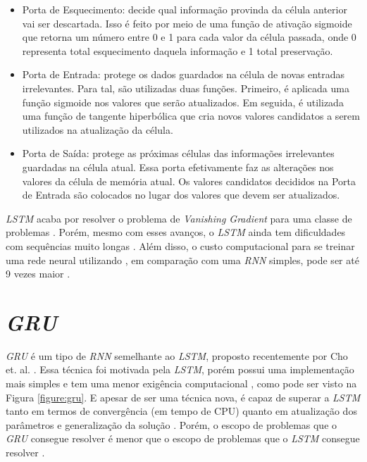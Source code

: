 \begin{itemize}
  \item Porta de Esquecimento: decide qual informação provinda da célula anterior vai ser descartada. Isso é feito por meio de uma função de ativação sigmoide que retorna um número entre 0 e 1 para cada valor da célula passada, onde 0 representa total esquecimento daquela informação e 1 total preservação.
  
  \item Porta de Entrada: protege os dados guardados na célula de novas entradas irrelevantes. Para tal, são utilizadas duas funções. Primeiro, é aplicada uma função sigmoide nos valores que serão atualizados. Em seguida, é utilizada uma função de tangente hiperbólica que cria novos valores candidatos a serem utilizados na atualização da célula.
  
  \item Porta de Saída: protege as próximas células das informações irrelevantes guardadas na célula atual. Essa porta efetivamente faz as alterações nos valores da célula de memória atual. Os valores candidatos decididos na Porta de Entrada são colocados no lugar dos valores que devem ser atualizados.
\end{itemize}

\textit{\acrshort{LSTM}} acaba por resolver o problema de \textit{Vanishing Gradient} para uma classe de problemas \cite{doi:10.1162/neco.1997.9.8.1735}. Porém, mesmo com esses avanços, o \textit{\acrshort{LSTM}} ainda tem dificuldades com sequências muito longas \cite{alex2012}. Além disso, o custo computacional para se treinar uma rede neural utilizando , em comparação com uma \textit{\acrshort{RNN}} simples, pode ser até 9 vezes maior \cite{doi:10.1162/neco.1997.9.8.1735}.

\section{\textit{\acrfull{GRU}}}

\textit{\acrshort{GRU}} é um tipo de \textit{\acrshort{RNN}} semelhante ao \textit{\acrshort{LSTM}}, proposto recentemente por Cho et. al. \cite{cho2014}. Essa técnica foi motivada pela \textit{\acrshort{LSTM}}, porém possui uma implementação mais simples e tem uma menor exigência computacional \cite{cho2014}, como pode ser visto na Figura \ref{figure:gru}. E apesar de ser uma técnica nova, é capaz de superar a \textit{\acrshort{LSTM}} tanto em termos de convergência (em tempo de CPU) quanto em atualização dos parâmetros e generalização da solução \cite{chung2014empirical}. Porém, o escopo de problemas que o \textit{\acrshort{GRU}} consegue resolver é menor que o escopo de problemas que o \textit{\acrshort{LSTM}} consegue resolver \cite{weiss2018}.

